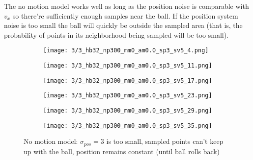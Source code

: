 \documentclass[10pt,a4paper,twoside]{article}
\newcommand{\sweepsize}{0.26}
\begin{document}
The no motion model works well as long as the position noise is comparable with
$v_x$ so there're sufficiently enough samples near the ball.
If the position system noise is too small the ball will quickly be outside the
sampled area (that is, the probability of points in its neighborhood being
sampled will be too small).
\begin{figure}[h]
    \centering
    \begin{subfigure}{\sweepsize\textwidth}
    \texttt{[image: 3/3\_hb32\_np300\_mm0\_am0.0\_sp3\_sv5\_4.png]} 
    \end{subfigure}
    \begin{subfigure}{\sweepsize\textwidth}
    \texttt{[image: 3/3\_hb32\_np300\_mm0\_am0.0\_sp3\_sv5\_11.png]} 
    \end{subfigure}
    \begin{subfigure}{\sweepsize\textwidth}
    \texttt{[image: 3/3\_hb32\_np300\_mm0\_am0.0\_sp3\_sv5\_17.png]} 
    \end{subfigure}
    \begin{subfigure}{\sweepsize\textwidth}
    \texttt{[image: 3/3\_hb32\_np300\_mm0\_am0.0\_sp3\_sv5\_23.png]} 
    \end{subfigure}
    \begin{subfigure}{\sweepsize\textwidth}
    \texttt{[image: 3/3\_hb32\_np300\_mm0\_am0.0\_sp3\_sv5\_29.png]} 
    \end{subfigure}
    \begin{subfigure}{\sweepsize\textwidth}
    \texttt{[image: 3/3\_hb32\_np300\_mm0\_am0.0\_sp3\_sv5\_35.png]} 
    \end{subfigure}
    \caption{No motion model: $\sigma_{pos}=3$ is too small, sampled points can't keep up with
    the ball, position remains constant (until ball rolls back)}
\end{figure}
\end{document}
